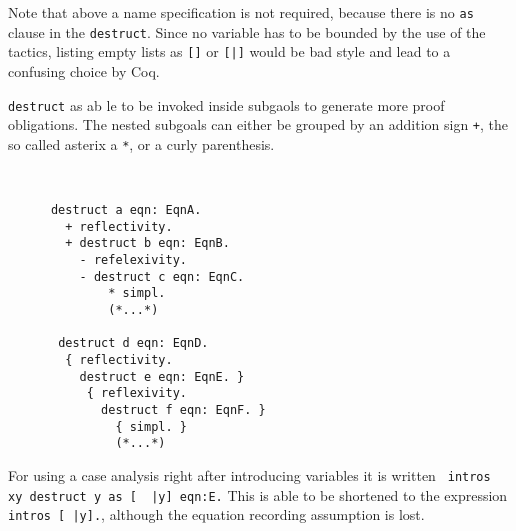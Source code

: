 	 Note that above a name specification is not required, because there is no \lstinline!as! clause in the \lstinline!destruct!.
	 Since no variable has to be bounded by the use of the tactics, listing empty lists as \lstinline![]! or \lstinline![|]! would be bad style and lead to a confusing choice by Coq.
	 
	 \lstinline!destruct! as ab le to be invoked inside subgaols to generate more proof obligations.
	  The nested subgoals can either be grouped by an addition sign \lstinline!+!, the so called asterix a \lstinline!*!, or a curly parenthesis.
	  \begin{example} ~\\\vspace{-10mm}
	  \begin{lstlisting}
	  destruct a eqn: EqnA.
	    + reflectivity.
	    + destruct b eqn: EqnB.
	      - refelexivity.
	      - destruct c eqn: EqnC.
	          * simpl. 
	          (*...*)       
	  
	   destruct d eqn: EqnD.
	    { reflectivity.
	      destruct e eqn: EqnE. } 
	       { reflexivity.
	         destruct f eqn: EqnF. } 
	           { simpl. }
	           (*...*)   
	   \end{lstlisting}
	   \end{example}     
	 
	  For using a case analysis right after introducing variables it is written
	  \lstinline! intros xy destruct y as [  |y] eqn:E.!	
	  This is able to be shortened to the expression \lstinline! intros [ |y].!, although the equation recording assumption is lost.   
    
   